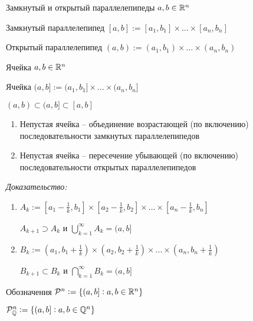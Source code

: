 \documentclass[12pt]{article}
\begin{document}
\begin{defin}{Замкнутый и открытый параллелепипеды}
    $a, b \in \mathbb R^n$

    Замкнутый параллелепипед $[a, b] := [a_1, b_1] \times \ldots \times [a_n, b_n]$

    Открытый параллелепипед $(a, b) := (a_1, b_1) \times \ldots \times (a_n, b_n)$
\end{defin}

\begin{defin}{Ячейка}
    $a, b \in \mathbb R^n$

    Ячейка $(a, b] := (a_1, b_1] \times \ldots \times (a_n, b_n]$
\end{defin}

\begin{Remark}{}
    $(a, b) \subset (a, b] \subset [a, b]$
\end{Remark}

\begin{propos}{}
    \begin{enumerate}
        \item Непустая ячейка -- объединение возрастающей (по включению) последовательности замкнутых параллелепипедов
        \item Непустая ячейка -- пересечение убывающей (по включению) последовательности открытых параллелепипедов
    \end{enumerate}
\end{propos}

\textit{Доказательство:}

\begin{enumerate}
    \item $A_k := [a_1 - \frac{1}{k}, b_1] \times [a_2 - \frac{1}{k}, b_2] \times \ldots \times [a_n - \frac{1}{k}, b_n]$
    
    $A_{k + 1} \supset A_k$ и $\bigcup\limits_{k = 1}^\infty A_k = (a, b]$

    \item $B_k := (a_1, b_1 + \frac{1}{k}) \times (a_2, b_2 + \frac{1}{k}) \times \ldots \times (a_n, b_n + \frac{1}{k})$
    
    $B_{k + 1} \subset B_k$ и $\bigcap\limits_{k = 1}^\infty B_k = (a, b]$
\end{enumerate}

\begin{declar}{Обозначения}
    $\mathcal{P}^n := \{(a, b] : a, b \in \mathbb R^n\}$

    $\mathcal{P}_\mathbb Q^n := \{(a, b] : a, b \in \mathbb Q^n\}$
\end{declar}
\end{document}
